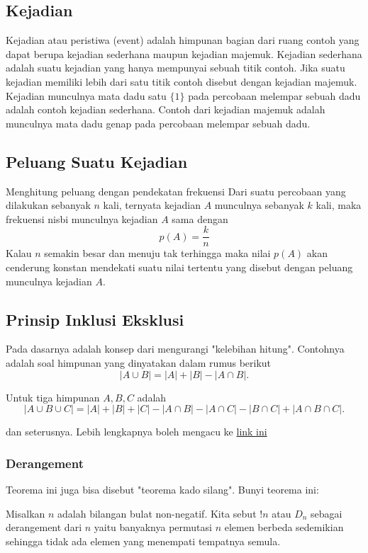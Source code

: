 \subsection{Kejadian}
Kejadian atau peristiwa (event) adalah himpunan bagian dari ruang contoh yang dapat berupa
kejadian sederhana maupun kejadian majemuk. Kejadian sederhana adalah suatu kejadian yang
hanya mempunyai sebuah titik contoh. Jika suatu kejadian memiliki lebih dari satu titik contoh 
disebut dengan kejadian majemuk. 
Kejadian munculnya mata dadu satu $\{1\}$ pada percobaan melempar sebuah dadu adalah contoh 
kejadian sederhana. Contoh dari kejadian majemuk adalah munculnya mata dadu genap pada 
percobaan melempar sebuah dadu. 
    
\subsection{Peluang Suatu Kejadian}
Menghitung peluang dengan pendekatan frekuensi 
Dari suatu percobaan yang dilakukan sebanyak $n$ kali, ternyata kejadian $A$ munculnya sebanyak 
$k$ kali, maka frekuensi nisbi munculnya kejadian $A$ sama dengan 
$$p(A)=\dfrac{k}{n}$$
Kalau $n$ semakin besar dan menuju tak terhingga maka nilai $p(A)$ akan cenderung konstan 
mendekati suatu nilai tertentu yang disebut dengan peluang munculnya kejadian $A$.

    \subsection{Prinsip Inklusi Eksklusi}
    Pada dasarnya adalah konsep dari mengurangi "kelebihan hitung". Contohnya adalah soal himpunan yang dinyatakan dalam rumus berikut
    $$|A \cup B|=|A|+|B|-|A \cap B|.$$
    
    Untuk tiga himpunan $A,B,C$ adalah
    $$|A \cup B \cup C|=|A|+|B|+|C|-|A \cap B|-|A \cap C|-|B \cap C|+|A \cap B \cap C|.$$
    
    dan seterusnya. Lebih lengkapnya boleh mengacu ke \href{https://brilliant.org/wiki/principle-of-inclusion-and-exclusion-pie/}{link ini}
    
    \subsubsection{Derangement}
    Teorema ini juga bisa disebut "teorema kado silang". Bunyi teorema ini:
    
    Misalkan $n$ adalah bilangan bulat non-negatif. Kita sebut $!n$ atau $D_n$ sebagai derangement dari $n$ yaitu banyaknya permutasi $n$ elemen berbeda sedemikian sehingga tidak ada elemen yang menempati tempatnya semula.
    
